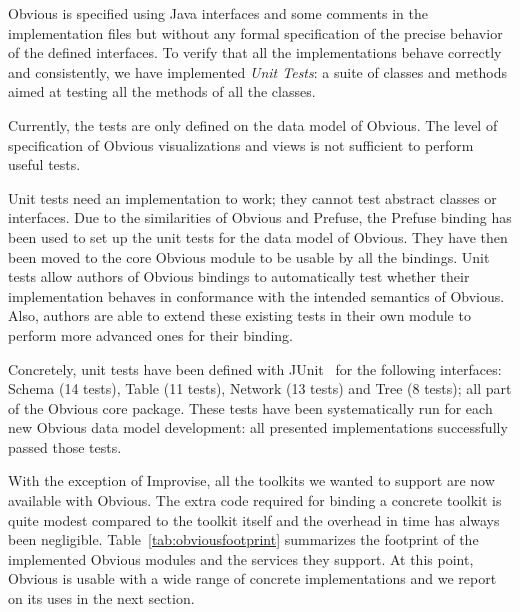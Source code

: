 Obvious is specified using Java interfaces and some comments in the
implementation files but without any formal specification of the
precise behavior of the defined interfaces.  To verify that all the
implementations behave correctly and consistently, we have implemented
\emph{Unit Tests}: a suite of classes and methods aimed at testing all
the methods of all the classes.

Currently, the tests are only defined on the data model of Obvious.
The level of specification of Obvious visualizations and views is not
sufficient to perform useful tests.

Unit tests need an implementation to work; they cannot test abstract
classes or interfaces.  Due to the similarities of Obvious and
Prefuse, the Prefuse binding has been used to set up the unit tests
for the data model of Obvious.  They have then been moved to the core
Obvious module to be usable by all the bindings.  Unit tests allow
authors of Obvious bindings to automatically test whether their
implementation behaves in conformance with the intended semantics of
Obvious.  Also, authors are able to extend these existing tests in
their own module to perform more advanced ones for their binding.

Concretely, unit tests have been defined with JUnit~\cite{JUnit} for
the following interfaces: Schema (14 tests), Table (11 tests), Network
(13 tests) and Tree (8 tests); all part of the Obvious core package.
These tests have been systematically run for each new Obvious data
model development: all presented implementations successfully passed
those tests.



With the exception of Improvise, all the toolkits we wanted to support
are now available with Obvious.  The extra code required for binding a
concrete toolkit is quite modest compared to the toolkit itself and
the overhead in time has always been negligible.
Table~\ref{tab:obviousfootprint} summarizes the footprint of the
implemented Obvious modules and the services they support.  At this
point, Obvious is usable with a wide range of concrete implementations
and we report on its uses in the next section.

